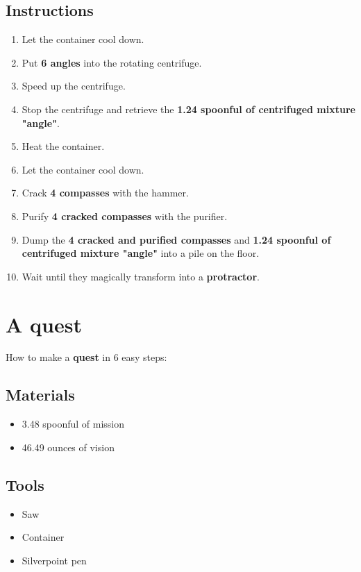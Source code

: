 \documentclass{article}
\begin{document}
\subsection{Instructions}\begin{enumerate}
\item 
Let the container cool down.
\item 
Put \textbf{6 angles} into the rotating centrifuge.
\item 
Speed up the centrifuge.
\item 
Stop the centrifuge and retrieve the \textbf{1.24 spoonful of centrifuged mixture "angle"}.
\item 
Heat the container.
\item 
Let the container cool down.
\item 
Crack \textbf{4 compasses} with the hammer.
\item 
Purify \textbf{4 cracked compasses} with the purifier.
\item 
Dump the \textbf{4 cracked and purified compasses} and \textbf{1.24 spoonful of centrifuged mixture "angle"} into a pile on the floor.
\item 
Wait until they magically transform into a \textbf{protractor}.
\end{enumerate}
\newpage
\section{A quest}How to make a \textbf{quest} in 6 easy steps:

\subsection{Materials}\begin{itemize}
\item 
3.48 spoonful of mission
\item 
46.49 ounces of vision
\end{itemize}
\subsection{Tools}\begin{itemize}
\item 
Saw
\item 
Container
\item 
Silverpoint pen
\end{itemize}
\end{document}
